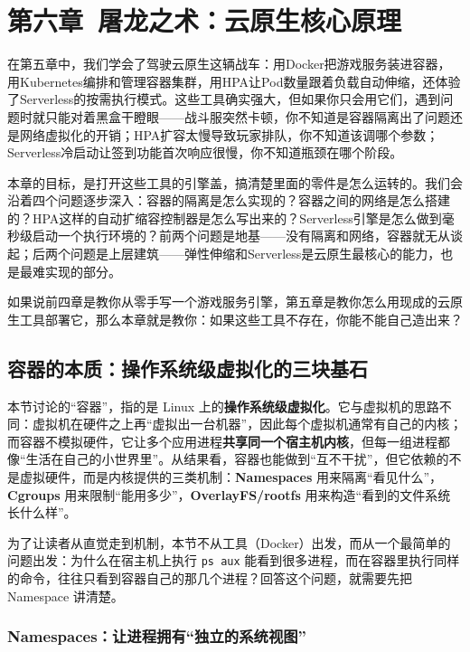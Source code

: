 \section{第六章\ 屠龙之术：云原生核心原理}

在第五章中，我们学会了驾驶云原生这辆战车：用Docker把游戏服务装进容器，用Kubernetes编排和管理容器集群，用HPA让Pod数量跟着负载自动伸缩，还体验了Serverless的按需执行模式。这些工具确实强大，但如果你只会用它们，遇到问题时就只能对着黑盒干瞪眼——战斗服突然卡顿，你不知道是容器隔离出了问题还是网络虚拟化的开销；HPA扩容太慢导致玩家排队，你不知道该调哪个参数；Serverless冷启动让签到功能首次响应很慢，你不知道瓶颈在哪个阶段。

本章的目标，是打开这些工具的引擎盖，搞清楚里面的零件是怎么运转的。我们会沿着四个问题逐步深入：容器的隔离是怎么实现的？容器之间的网络是怎么搭建的？HPA这样的自动扩缩容控制器是怎么写出来的？Serverless引擎是怎么做到毫秒级启动一个执行环境的？前两个问题是地基——没有隔离和网络，容器就无从谈起；后两个问题是上层建筑——弹性伸缩和Serverless是云原生最核心的能力，也是最难实现的部分。

如果说前四章是教你从零手写一个游戏服务引擎，第五章是教你怎么用现成的云原生工具部署它，那么本章就是教你：如果这些工具不存在，你能不能自己造出来？

\subsection{容器的本质：操作系统级虚拟化的三块基石}

本节讨论的“容器”，指的是 Linux 上的\textbf{操作系统级虚拟化}。它与虚拟机的思路不同：虚拟机在硬件之上再“虚拟出一台机器”，因此每个虚拟机通常有自己的内核；而容器不模拟硬件，它让多个应用进程\textbf{共享同一个宿主机内核}，但每一组进程都像“生活在自己的小世界里”。从结果看，容器也能做到“互不干扰”，但它依赖的不是虚拟硬件，而是内核提供的三类机制：\textbf{Namespaces} 用来隔离“看见什么”，\textbf{Cgroups} 用来限制“能用多少”，\textbf{OverlayFS/rootfs} 用来构造“看到的文件系统长什么样”。

为了让读者从直觉走到机制，本节不从工具（Docker）出发，而从一个最简单的问题出发：为什么在宿主机上执行 \texttt{ps aux} 能看到很多进程，而在容器里执行同样的命令，往往只看到容器自己的那几个进程？回答这个问题，就需要先把 Namespace 讲清楚。 %

\subsubsection{Namespaces：让进程拥有“独立的系统视图”}

